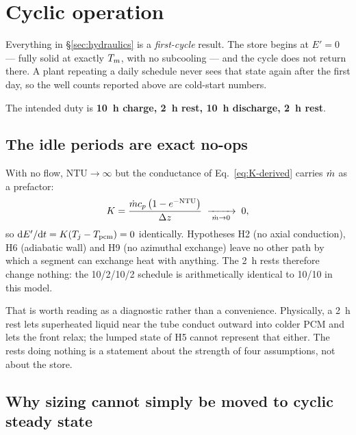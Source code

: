 \section{Cyclic operation}
\label{sec:cyclic}

Everything in \S\ref{sec:hydraulics} is a \emph{first-cycle} result. The store
begins at $E'=0$ --- fully solid at exactly $T_{m}$, with no subcooling --- and
the cycle does not return there. A plant repeating a daily schedule never sees
that state again after the first day, so the well counts reported above are
cold-start numbers.

The intended duty is \textbf{\SI{10}{\hour} charge, \SI{2}{\hour} rest,
\SI{10}{\hour} discharge, \SI{2}{\hour} rest}.

\subsection{The idle periods are exact no-ops}
\label{sec:cyclic:rest}

With no flow, $\mathrm{NTU}\to\infty$ but the conductance of
Eq.~\eqref{eq:K-derived} carries $\dot m$ as a prefactor:
\begin{equation}
  K = \frac{\dot m c_{p}\left(1-e^{-\mathrm{NTU}}\right)}{\Delta z}
  \;\xrightarrow[\;\dot m\to0\;]{}\; 0 ,
\end{equation}
so $\mathrm{d}E'/\mathrm{d}t = K(T_{j}-T_{\mathrm{pcm}}) = 0$ identically. Hypotheses H2
(no axial conduction), H6 (adiabatic wall) and H9 (no azimuthal exchange) leave
no other path by which a segment can exchange heat with anything. The
\SI{2}{\hour} rests therefore change nothing: the 10/2/10/2 schedule is
arithmetically identical to 10/10 in this model.

That is worth reading as a diagnostic rather than a convenience. Physically, a
\SI{2}{\hour} rest lets superheated liquid near the tube conduct outward into
colder PCM and lets the front relax; the lumped state of H5 cannot represent
that either. The rests doing nothing is a statement about the strength of four
assumptions, not about the store.

\subsection{Why sizing cannot simply be moved to cyclic steady state}
\label{sec:cyclic:degenerate}

